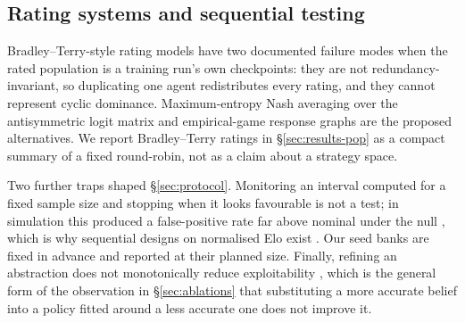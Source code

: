 \documentclass[11pt]{article}
\theoremstyle{definition}
\begin{document}
\subsection{Rating systems and sequential testing}

Bradley--Terry-style rating models \cite{coulom-whr,herbrich-trueskill} have
two documented failure modes when the rated population is a training run's own
checkpoints: they are not redundancy-invariant, so duplicating one agent
redistributes every rating, and they cannot represent cyclic dominance.
Maximum-entropy Nash averaging over the antisymmetric logit matrix
\cite{balduzzi-reeval} and empirical-game response graphs
\cite{omidshafiei-alpharank} are the proposed alternatives. We report
Bradley--Terry ratings in \S\ref{sec:results-pop} as a compact summary of a
fixed round-robin, not as a claim about a strategy space.

Two further traps shaped \S\ref{sec:protocol}. Monitoring an interval computed
for a fixed sample size and stopping when it looks favourable is not a test;
in simulation this produced a false-positive rate far above nominal under the
null \cite{avaivat}, which is why sequential designs on normalised Elo exist
\cite{nelo}. Our seed banks are fixed in advance and reported at their planned
size. Finally, refining an abstraction does not monotonically reduce
exploitability \cite{waugh-abstraction}, which is the general form of the
observation in \S\ref{sec:ablations} that substituting a more accurate belief
into a policy fitted around a less accurate one does not improve it.
\end{document}
